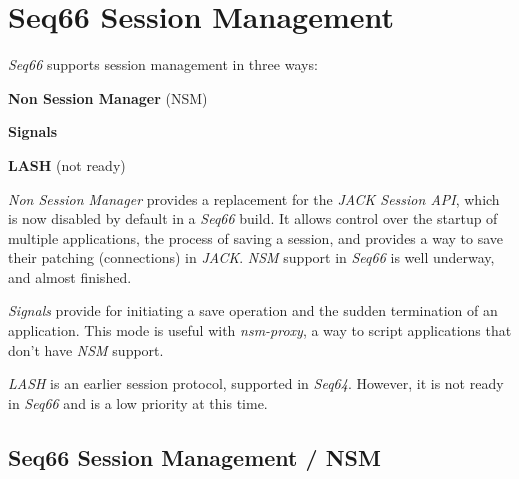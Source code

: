 %
%
%

\section{Seq66 Session Management}
\label{sec:sessions}

   \textsl{Seq66} supports session management in three ways:

   \begin{enumber}
      \item \textbf{Non Session Manager} (NSM)
      \item \textbf{Signals}
      \item \textbf{LASH} (not ready)
   \end{enumber}

\textsl{Non Session Manager} provides a replacement for the
\textsl{JACK Session API}, which is now disabled by default in a \textsl{Seq66}
build.  It allows control over the startup of multiple applications, the
process of saving a session, and
provides a way to save their patching (connections) in \textsl{JACK}.
\textsl{NSM} support in \textsl{Seq66} is well underway, and almost finished.

\textsl{Signals} provide for initiating a save operation and the sudden
termination of an application.  This mode is useful with
\textsl{nsm-proxy}, a way to script applications that don't have \textsl{NSM}
support.

\textsl{LASH} is an earlier session protocol, supported in \textsl{Seq64}.
However, it is not ready in \textsl{Seq66} and is a low priority at this time.


\subsection{Seq66 Session Management / NSM}
\label{subsec:sessions_nsm}

